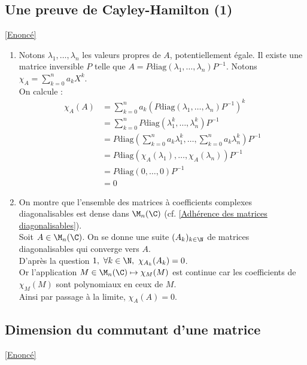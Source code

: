 \documentclass{book}
\begin{document}
	\subsection{Une preuve de Cayley-Hamilton (1) }
	\label{sec:une-preuve-de-cayley-hamilton-1-etoile2}
	\textcolor{blue}{\hyperref[Une preuve de Cayley-Hamilton (1)]{[Enoncé]}}\\
	\begin{enumerate}
		\item Notons $\lambda_1,\dots,\lambda_n$ les valeurs propres de $A$, potentiellement égale. Il existe une matrice inversible $P$ telle que $A=P\text{diag}(\lambda_1,\dots,\lambda_n)P^{-1}$. Notons $\chi_A=\displaystyle\sum\limits_{k=0}^na_kX^k$.\\
		On calcule :
		\begin{align*}
			\chi_A(A)&=\sum\limits_{k=0}^na_k\left(P\text{diag}(\lambda_1,\dots,\lambda_n)P^{-1}\right)^k\\
			&=\sum\limits_{k=0}^nP\text{diag}\left(\lambda_1^k,\dots,\lambda_n^k\right)P^{-1}\\
			&=P\text{diag}\left(\sum\limits_{k=0}^na_k\lambda_1^k,\dots,\sum\limits_{k=0}^na_k\lambda_n^k\right)P^{-1}\\
			&=P\text{diag}(\chi_A(\lambda_1),\dots,\chi_A(\lambda_n))P^{-1}\\
			&=P\text{diag}(0,\dots,0)P^{-1}\\
			&=0
		\end{align*}
		\item On montre que l'ensemble des matrices à coefficients complexes diagonalisables est dense dans $\M_n(\C)$ (cf. \ref{Adhérence des matrices diagonalisables}).\\
		Soit $A\in \M_n(\C)$. On se donne une suite $(A_k)_{k\in\N}$ de matrices diagonalisables qui converge vers $A$.\\
		D'après la question $1,\ \forall k\in \N,\ \chi_{A_k}(A_k)=0$.\\
		Or l'application $M\in\M_n(\C)\mapsto \chi_M(M)$ est continue car les coefficients de $\chi_M(M)$ sont polynomiaux en ceux de $M$.\\
		Ainsi par passage à la limite, $\chi_A(A)=0$.
	\end{enumerate}
	
	\subsection{Dimension du commutant d'une matrice}
	\label{sec:dimension-du-commutant-dune-matrice}
	\textcolor{blue}{\hyperref[Dimension du commutant d'une matrice]{[Enoncé]}}\\
	
\end{document}
